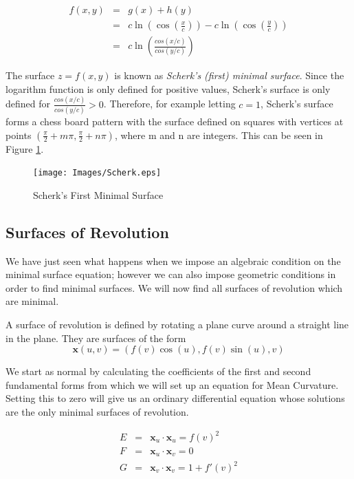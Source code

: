 \begin{eqnarray}
\nonumber
f(x,y) &=& g(x) + h(y) \\
\nonumber
&=& c \ln(\cos \left(\frac{x}{c}\right))-c \ln(\cos \left(\frac{y}{c}\right)) \\
\label{equ:Scherk_f}
&=& c \ln\left(\frac{cos(x/c)}{cos(y/c)}\right)
\end{eqnarray}

The surface $z=f(x,y)$ is known as \emph{Scherk's (first) minimal surface}. Since the logarithm function is only defined for positive values, Scherk's surface is only defined for $\frac{cos(x/c)}{cos(y/c)} > 0$. Therefore, for example letting $c=1$, Scherk's surface forms a chess board pattern with the surface defined on squares with vertices at points $\left(\frac{\pi}{2}+m\pi,\frac{\pi}{2}+n\pi\right)$, where m and n are integers. This can be seen in Figure \ref{fig:scherk}.

\begin{figure}[htbp]
	\centering
       \texttt{[image: Images/Scherk.eps]}
   \caption{Scherk's First Minimal Surface}
   \label{fig:scherk}
\end{figure} 

\subsection{Surfaces of Revolution}
We have just seen what happens when we impose an algebraic condition on the minimal surface equation; however we can also impose geometric conditions in order to find minimal surfaces. We will now find all surfaces of revolution which are minimal. 
\begin{definition}
A surface of revolution is defined by rotating a plane curve around a straight line in the plane. They are surfaces of the form
\begin{displaymath}
\mathbf x(u,v) = (f(v) \cos(u), f(v) \sin(u), v)
\end{displaymath}
\end{definition}

We start as normal by calculating the coefficients of the first and second fundamental forms from which we will set up an equation for Mean Curvature. Setting this to zero will give us an ordinary differential equation whose solutions are the only minimal surfaces of revolution.

\begin{eqnarray}
\nonumber
E &=& \mathbf x_u \cdot \mathbf x_u = f(v)^2 \\
\nonumber
F &=& \mathbf x_u \cdot \mathbf x_v = 0 \\
\nonumber
G &=& \mathbf x_v \cdot \mathbf x_v = 1 + f'(v)^2
\end{eqnarray}

